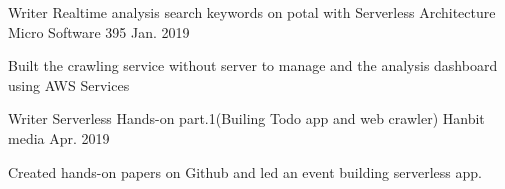 

\begin{cventries}

  \cventry
    {Writer} %
    {Realtime analysis search keywords on potal with Serverless Architecture} %
    {Micro Software 395} %
    {Jan. 2019} %
    {
      \begin{cvitems} %
        \item {Built the crawling service without server to manage and the analysis dashboard using AWS Services}
      \end{cvitems}
    }

  \cventry
    {Writer} %
    {Serverless Hands-on part.1(Builing Todo app and web crawler)} %
    {Hanbit media} %
    {Apr. 2019} %
    {
      \begin{cvitems} %
        \item {Created hands-on papers on Github and led an event building serverless app.}
      \end{cvitems}
    }

\end{cventries}

